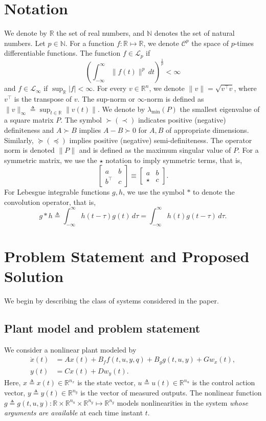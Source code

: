 \documentclass[times, doublespace]{rncauth}
\newcommand{\intinf}{\int_{-\infty}^{\infty}}
\begin{document}
\section{Notation}\label{sec:notation}
We denote by $\mathbb{R}$ the set of real numbers, and $\mathbb{N}$ denotes the set of natural numbers. Let $p\in\mathbb{{N}}$. For a function $f:\mathbb{R}\mapsto\mathbb{R}$, we denote $\mathcal{C}^p$ the space of $p$-times differentiable functions. The function $f\in\mathcal L_p$ if $$\left(\intinf \|f(t)\|^p\,dt\right)^{\frac{1}{p}}< \infty$$ and $f\in\mathcal L_\infty$ if $\sup_\mathbb{R} |f| <\infty$.
For every $v\in\mathbb{R}^n$, we denote $\|v\|=\sqrt{v^\top v}$, where $v^\top$ is the transpose of $v$. The sup-norm or $\infty$-norm is defined as $\|v\|_\infty \triangleq \sup_{t\in\mathbb{R}}\|v(t)\|$. We denote by $\lambda_{\min}(P)$ the smallest eigenvalue of a square matrix $P$. The symbol $\succ(\prec)$ indicates positive (negative) definiteness and $A\succ B$ implies $A-B\succ 0$ for $A,B$ of appropriate dimensions. Similarly, $\succeq (\preceq)$ implies positive (negative) semi-definiteness. The operator norm is denoted $\|P\|$ and is defined as the maximum singular value of $P$. For a symmetric matrix, we use the $\star$ notation to imply symmetric terms, that is,
\[
\begin{bmatrix} a & b \\ b^\top & c\end{bmatrix} \equiv \begin{bmatrix}
a & b \\ \star & c
\end{bmatrix}.
\] 
For Lebesgue integrable functions $g, h$, we use the symbol $\ast$ to denote the convolution operator, that is,
\[
g\ast h\triangleq \intinf h(t-\tau)g(t)\,d\tau = \intinf h(t)g(t-\tau)\,d\tau.
\]

\section{Problem Statement and Proposed Solution}\label{sec:prob}
We begin by describing the class of systems considered in the paper.  
\subsection{Plant model and problem statement}
We consider a nonlinear plant modeled by
\begin{subequations}
	\label{eq:sys_nom}
	\begin{align}
	\dot x(t) &= Ax(t)+B_f f(t,u,y,q) + B_g g(t,u,y) +  G w_x(t),\label{eq:sys_nom_a}\\
	y(t) &= C x(t) + D w_y(t).
	\end{align}
\end{subequations}
Here, $x\triangleq x(t)\in\mathbb{R}^{n_x}$ is the state vector, $u\triangleq u(t)\in\mathbb{R}^{n_u}$ is the control action vector, $y\triangleq y(t)\in\mathbb{R}^{n_y}$ is the vector of measured outputs. The nonlinear function $g\triangleq g(t,u,y):\mathbb{R}\times\mathbb{R}^{n_u}\times\mathbb{R}^{n_y}\mapsto\mathbb{R}^{n_g}$ models nonlinearities in the system \textit{whose arguments are available} at each time instant $t$. 
\end{document}
